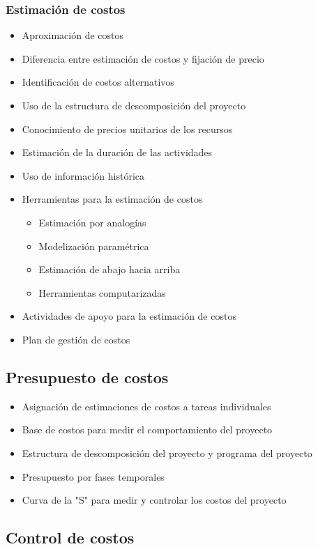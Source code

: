 \documentclass{article} %
\begin{document}
\subsubsection{Estimación de costos}
\begin{itemize}
    \item Aproximación de costos
    \item Diferencia entre estimación de costos y fijación de precio
    \item Identificación de costos alternativos
    \item Uso de la estructura de descomposición del proyecto
    \item Conocimiento de precios unitarios de los recursos
    \item Estimación de la duración de las actividades
    \item Uso de información histórica
    \item Herramientas para la estimación de costos
    \begin{itemize}
        \item Estimación por analogías
        \item Modelización paramétrica
        \item Estimación de abajo hacia arriba
        \item Herramientas computarizadas
    \end{itemize}
    \item Actividades de apoyo para la estimación de costos
    \item Plan de gestión de costos
\end{itemize}

\subsection{Presupuesto de costos}
\begin{itemize}
    \item Asignación de estimaciones de costos a tareas individuales
    \item Base de costos para medir el comportamiento del proyecto
    \item Estructura de descomposición del proyecto y programa del proyecto
    \item Presupuesto por fases temporales
    \item Curva de la "S" para medir y controlar los costos del proyecto
\end{itemize}

\subsection{Control de costos}
\end{document}

